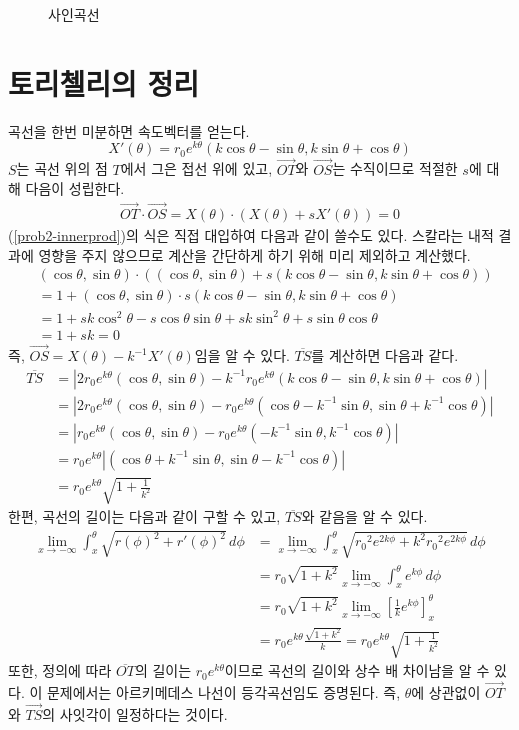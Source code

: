 \documentclass{scrartcl}
\newcommand{\Seg}[1]{\overline{#1}}
\newcommand{\Ray}[1]{\overrightarrow{#1}}
\begin{document}
\begin{figure}[H]
\centering

\caption{사인곡선}
\label{fig:sinusoid}
\end{figure}

\section{토리첼리의 정리}
곡선을 한번 미분하면 속도벡터를 얻는다.
\[X'(\theta)=r_0e^{k\theta}(k\cos\theta-\sin\theta,k\sin\theta+\cos\theta)\]
\(S\)는 곡선 위의 점 \(T\)에서 그은 접선 위에 있고, \(\Ray{OT}\)와 \(\Ray{OS}\)는 수직이므로 적절한 \(s\)에 대해 다음이 성립한다.
\begin{align}\label{prob2-innerprod}
\Ray{OT}\cdot\Ray{OS}=X(\theta)\cdot(X(\theta)+sX'(\theta))=0
\end{align}
(\ref{prob2-innerprod})의 식은 직접 대입하여 다음과 같이 쓸수도 있다. 스칼라는 내적 결과에 영향을 주지 않으므로 계산을 간단하게 하기 위해 미리 제외하고 계산했다.
\begin{align*}
&(\cos\theta, \sin\theta)\cdot((\cos\theta, \sin\theta)+s(k\cos\theta-\sin\theta, k\sin\theta+\cos\theta)) \\
&=1+(\cos\theta, \sin\theta)\cdot s(k\cos\theta-\sin\theta, k\sin\theta+\cos\theta) \\
&=1+sk\cos^2\theta-s\cos\theta\sin\theta+sk\sin^2\theta+s\sin\theta\cos\theta \\
&=1+sk=0
\end{align*}
즉, \(\Ray{OS}=X(\theta)-k^{-1}X'(\theta)\)임을 알 수 있다. \(\Seg{TS}\)를 계산하면 다음과 같다.
\begin{align*}
\Seg{TS}&=\left|2r_0e^{k\theta}(\cos\theta,\sin\theta)-k^{-1}r_0e^{k\theta}(k\cos\theta-\sin\theta,k\sin\theta+\cos\theta)\right| \\
&=\left|2r_0e^{k\theta}(\cos\theta,\sin\theta)-r_0e^{k\theta}(\cos\theta-k^{-1}\sin\theta,\sin\theta+k^{-1}\cos\theta)\right| \\
&=\left|r_0e^{k\theta}(\cos\theta,\sin\theta)-r_0e^{k\theta}(-k^{-1}\sin\theta,k^{-1}\cos\theta)\right| \\
&=r_0e^{k\theta}\left|(\cos\theta+k^{-1}\sin\theta,\sin\theta-k^{-1}\cos\theta)\right| \\
&=r_0e^{k\theta}\sqrt{1+\frac{1}{k^2}}
\end{align*}
한편, 곡선의 길이는 다음과 같이 구할 수 있고, \(\Seg{TS}\)와 같음을 알 수 있다.
\begin{align*}
\lim_{x\to-\infty}\int^\theta_x \sqrt{r(\phi)^2+r'(\phi)^2}\,d\phi&=\lim_{x\to-\infty}\int^\theta_x \sqrt{{r_0}^2e^{2k\phi}+k^2{r_0}^2e^{2k\phi}}\,d\phi \\
&=r_0\sqrt{1+k^2}\lim_{x\to-\infty}\int^\theta_x e^{k\phi}\,d\phi \\
&=r_0\sqrt{1+k^2}\lim_{x\to-\infty}\left[\frac{1}{k}e^{k\phi}\right]^\theta_x \\
&=r_0e^{k\theta}\frac{\sqrt{1+k^2}}{k}=r_0e^{k\theta}\sqrt{1+\frac{1}{k^2}}
\end{align*}
또한, 정의에 따라 \(\Seg{OT}\)의 길이는 \(r_0e^{k\theta}\)이므로 곡선의 길이와 상수 배 차이남을 알 수 있다. 이 문제에서는 아르키메데스 나선이 등각곡선임도 증명된다. 즉, \(\theta\)에 상관없이 \(\Ray{OT}\)와 \(\Ray{TS}\)의 사잇각이 일정하다는 것이다.
\end{document}
